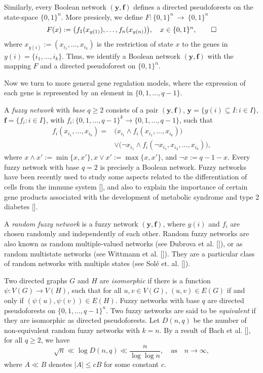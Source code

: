 \documentclass[letterpaper]{article}
\begin{document}
Similarly, every Boolean network $(\mathbf{y},\mathbf{f})$ defines a directed pseudoforests
on the state-space $\{0,1\}^n$. More presicely, we define 
 $F\colon \{0,1\}^n\ \to\ \{0,1\}^n$ 
\[
F(x):=\big(
 f_1( x_{y(1)}), \dots,
 f_n( x_{y(n)})
\big),\quad x\in \{0,1\}^n,\qedhere
\]
where $x_{y(i)}:=(x_{i_1},\dots,x_{i_k})$ is the restriction of state $x$ to the genes in $y(i)=\{i_1,\dots,i_k\}$. Thus, we identify a Boolean network $(\mathbf{y},\mathbf{f})$ with the mapping $F$ and a directed pseudoforest on $\{0,1\}^n$.

  
Now we turn to more general gene regulation models, where the expression of each gene is represented by  an element in $\{0,1,\dots,q-1\}$.


 A \emph{fuzzy network} with \emph{base} $q\geq 2$ consists of a pair $(\mathbf{y,f})$, $\mathbf{y}=\{y(i) \subseteq I :i\in I\}$, $\mathbf{f}=\{f_i:i\in I\}$, with $f_i\colon \{0,1,\dots,q-1\}^k\rightarrow \{0,1,\dots,q-1\}$, such that
 \begin{align} 
f_i(x_{i_1},\dots,x_{i_k})=& \big(x_{i_1}\wedge f_i(x_{i_1},\dots,x_{i_k})\big) \label{eq:1}\\
&\vee \big(\lnot x_{i_1} \wedge f_i(\lnot x_{i_1},x_{i_2},\dots,x_{i_k})\big),\nonumber
  \end{align}
  where $x\wedge x':=\min\{x,x'\}, x\vee x':=\max\{x,x'\}$, and $\lnot x:=q-1-x$.  
Every fuzzy network with base $q=2$ is precisely a Boolean network.  
 Fuzzy networks have been recently used to study some aspects related to the differentiation of cells from the immune system [], and also to explain the importance of certain gene products associated with the development of metabolic syndrome and type 2 diabetes [].  


A \emph{random fuzzy network} is a fuzzy network $(\mathbf{y,f})$, where   $y(i)$ and $f_i$ are chosen randomly and  independently of each other. 
Random fuzzy networks are also known as random multiple-valued networks (see Dubrova et al. []), or as random multistate networks (see Wittmann et al. []). 
They are a particular class of random networks with multiple states  (see Sol\'e et. al. []). 




Two directed graphs $G$ and $H$ are \emph{isomorphic} if there is a function $\psi\colon V(G)\rightarrow V(H)$, such that for all $u,v\in V(G)$, $(u,v)\in E(G)$ if and only if $(\psi(u), \psi(v))\in E(H)$. 
 Fuzzy networks with base $q$ are directed pseudoforests on $\{0,1,\dots,q-1\}^n$.
 Two fuzzy networks are said to be \emph{equivalent} if they are isomorphic as directed pseudoforests.  
Let $D(n,q)$ be the number of non-equivalent random fuzzy networks with $k=n$. 
By a result of Bach et al. [], for all $q\geq 2$, we have 
\[
\sqrt{n} \ll \log D(n,q) \ll \frac{n}{\log\log n}, \quad\text{as}\quad n\to \infty,
\]
 where $A\ll B$ denotes $|A|\leq cB$ for some constant $c$.
  
\end{document}
